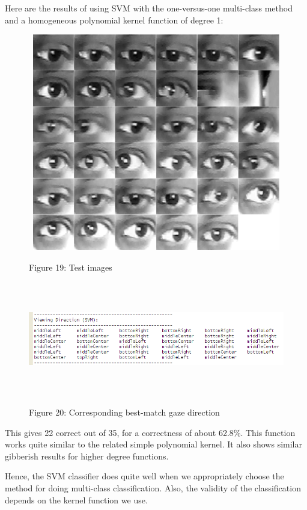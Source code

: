 \documentclass[12pt,letterpaper]{article}
\begin{document}
\newpage

Here are the results of using SVM with the one-versus-one multi-class method and a homogeneous polynomial
kernel function of degree 1:

\begin{figure}[h]
\centering
\includegraphics[width=120mm,height=95mm]{testImg3.png}

\small Figure 19: Test images
\end{figure}

\begin{figure}[h]
\centering
\includegraphics[width=170mm,height=50mm]{viewingDir6.png}

\small Figure 20: Corresponding best-match gaze direction
\end{figure}

This gives 22 correct out of 35, for a correctness of about 62.8\%. This function works quite similar to
the related simple polynomial kernel. It also shows similar gibberish results for higher degree functions.

Hence, the SVM classifier does quite well when we appropriately choose the method for doing multi-class 
classification. Also, the validity of the classification depends on the kernel function we use. 
\end{document}
